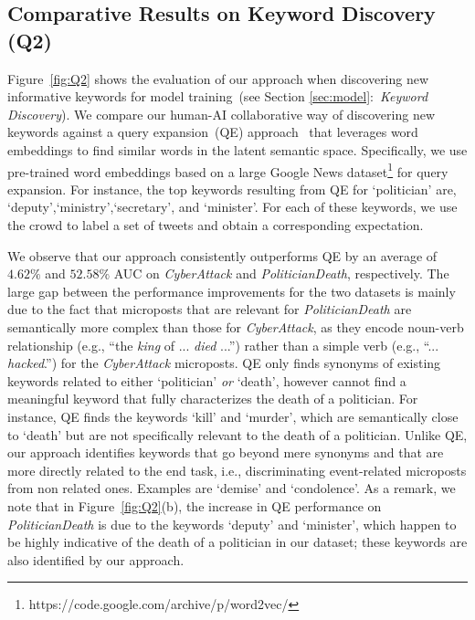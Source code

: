 \documentclass[letterpaper]{article}
\begin{document}
\subsection{Comparative Results on Keyword Discovery (Q2)}

Figure~\ref{fig:Q2} shows the evaluation of our approach when discovering new informative keywords for model training~(see Section \ref{sec:model}:~\emph{Keyword Discovery}). We compare our human-AI collaborative way of discovering new keywords against a query expansion~(QE) approach~\cite{diaz2016query,kuzi2016query} that leverages word embeddings to find similar words in the latent semantic space. Specifically, we use pre-trained word embeddings based on a large Google News dataset\footnote{https://code.google.com/archive/p/word2vec/} for query expansion. For instance, the top keywords resulting from QE for \lq politician' are, \lq deputy',\lq ministry',\lq secretary', and \lq minister'. For each of these keywords, we use the crowd to label a set of tweets and obtain a corresponding expectation.

We observe that our approach consistently outperforms QE by an average of $4.62\%$ and $52.58\%$ AUC on \emph{CyberAttack} and \emph{PoliticianDeath}, respectively. The large gap between the performance improvements for the two datasets is mainly due to the fact that microposts that are relevant for \emph{PoliticianDeath} are semantically more complex than those for \emph{CyberAttack}, as they encode noun-verb relationship (e.g., ``the \emph{king} of ... \emph{died} ...'') rather than a simple verb (e.g., ``... \emph{hacked}.'') for the \emph{CyberAttack} microposts. QE only finds synonyms of existing keywords related to either \lq politician' \emph{or} \lq death', however cannot find a meaningful keyword that fully characterizes the death of a politician. For instance, QE finds the keywords \lq kill' and \lq murder', which are semantically close to \lq death' but are not specifically relevant to the death of a politician. Unlike QE, our approach identifies keywords that go beyond mere synonyms and that are more directly related to the end task, i.e., discriminating event-related microposts from non related ones. Examples are \lq demise' and \lq condolence'. As a remark, we note that in Figure~\ref{fig:Q2}(b), the increase in QE performance on \emph{PoliticianDeath} is due to the keywords \lq deputy' and \lq minister', which happen to be highly indicative of the death of a politician in our dataset; these keywords are also identified by our approach.
\end{document}

